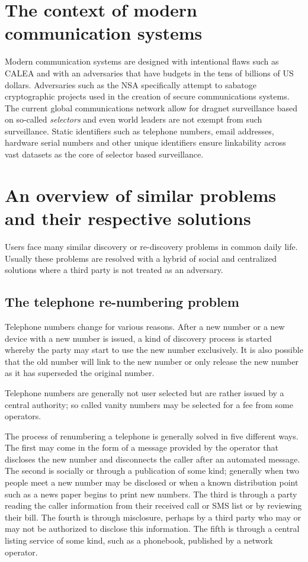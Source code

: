 \documentclass[letterpaper,twocolumn,10pt]{article}
\begin{document}
\section{The context of modern communication systems}
\label{sec:context}

Modern communication systems are designed with intentional flaws such as
CALEA\cite{CALEA} and with an adversaries that have budgets in the tens of
billions of US dollars\cite{NSABUDGET}. Adversaries such as the NSA
specifically attempt to sabatoge cryptographic projects\cite{BULLRUN} used in
the creation of secure communications systems. The current global
communications network allow for dragnet surveillance based on so-called {\it
selectors} and even world leaders\cite{MERKELPHONE} are not exempt from such
surveillance. Static identifiers such as telephone numbers, email addresses,
hardware serial numbers and other unique identifiers ensure linkability across
vast datasets as the core of selector based surveillance.

\section{An overview of similar problems and their respective solutions}

Users face many similar discovery or re-discovery problems in common daily
life. Usually these problems are resolved with a hybrid of social and
centralized solutions where a third party is not treated as an adversary.

\subsection{The telephone re-numbering problem}
\label{renumber:telephone}

Telephone numbers change for various reasons. After a new number or a new
device with a new number is issued, a kind of discovery process is started
whereby the party may start to use the new number exclusively. It is also
possible that the old number will link to the new number or only release the
new number as it has superseded the original number.

Telephone numbers are generally not user selected but are rather issued by a
central authority; so called vanity numbers may be selected for a fee from
some operators.

The process of renumbering a telephone is generally solved in five different
ways. The first may come in the form of a message provided by the operator
that discloses the new number and disconnects the caller after an automated
message. The second is socially or through a publication of some kind;
generally when two people meet a new number may be disclosed or when a known
distribution point such as a news paper begins to print new numbers. The third
is through a party reading the caller information from their received call or
SMS list or by reviewing their bill. The fourth is through
misclosure\cite{kellycaine}, perhaps by a third party who may or may not be
authorized to disclose this information. The fifth is through a central listing
service of some kind, such as a phonebook, published by a network operator.
\end{document}
